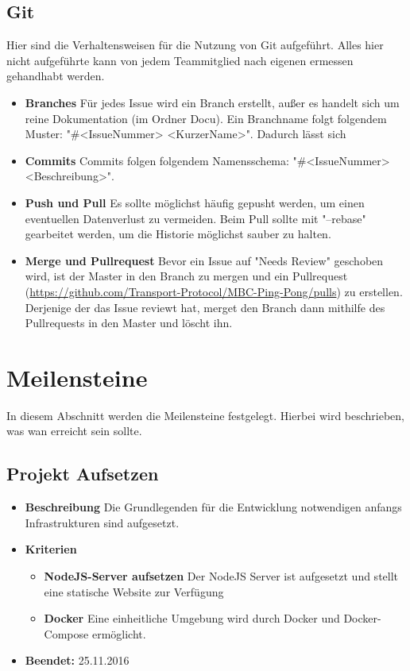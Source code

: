 \subsection{Git}
Hier sind die Verhaltensweisen für die Nutzung von Git aufgeführt. Alles hier nicht aufgeführte kann von jedem Teammitglied nach eigenen ermessen gehandhabt werden.
\begin{itemize}
	\item \textbf{Branches} \newline
	Für jedes Issue wird ein Branch erstellt, außer es handelt sich um reine Dokumentation (im Ordner Docu). Ein Branchname folgt folgendem Muster: "\#<IssueNummer> <KurzerName>". Dadurch lässt sich
	\item \textbf{Commits} \newline
	Commits folgen folgendem Namensschema: "\#<IssueNummer> <Beschreibung>".
	\item \textbf{Push und Pull} \newline
	Es sollte möglichst häufig gepusht werden, um einen eventuellen Datenverlust zu vermeiden. Beim Pull sollte mit "--rebase" gearbeitet werden, um die Historie möglichst sauber zu halten.
	\item \textbf{Merge und Pullrequest} \newline
	Bevor ein Issue auf "Needs Review" geschoben wird, ist der Master in den Branch zu mergen und ein Pullrequest (\href{https://github.com/Transport-Protocol/MBC-Ping-Pong/pulls}{https://github.com/Transport-Protocol/MBC-Ping-Pong/pulls}) zu erstellen. Derjenige der das Issue reviewt hat, merget den Branch dann mithilfe des Pullrequests in den Master und löscht ihn.
\end{itemize}

\section{Meilensteine}
In diesem Abschnitt werden die Meilensteine festgelegt. Hierbei wird beschrieben, was wan erreicht sein sollte.
\subsection{Projekt Aufsetzen}
\begin{itemize}
	\item \textbf{Beschreibung}\newline
	Die Grundlegenden für die Entwicklung notwendigen anfangs Infrastrukturen sind aufgesetzt.
	\item \textbf{Kriterien}
	\begin{itemize}
		\item \textbf{NodeJS-Server aufsetzen} \newline
		Der NodeJS Server ist aufgesetzt und stellt eine statische Website zur Verfügung
		\item \textbf{Docker} \newline
		Eine einheitliche Umgebung wird durch Docker und Docker-Compose ermöglicht.
	\end{itemize}
	\item \textbf{Beendet:} 25.11.2016
\end{itemize}

